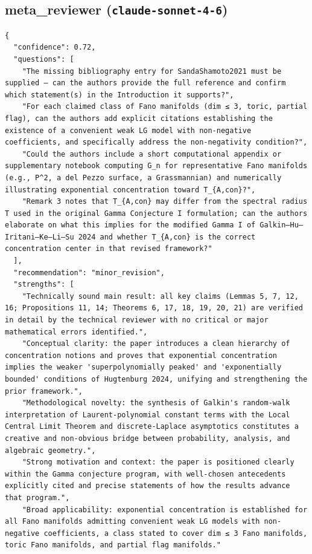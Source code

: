 \documentclass[11pt]{article}
\begin{document}
\subsection*{meta_reviewer (\texttt{claude-sonnet-4-6})}
\begin{verbatim}
{
  "confidence": 0.72,
  "questions": [
    "The missing bibliography entry for SandaShamoto2021 must be supplied — can the authors provide the full reference and confirm which statement(s) in the Introduction it supports?",
    "For each claimed class of Fano manifolds (dim ≤ 3, toric, partial flag), can the authors add explicit citations establishing the existence of a convenient weak LG model with non-negative coefficients, and specifically address the non-negativity condition?",
    "Could the authors include a short computational appendix or supplementary notebook computing G_n for representative Fano manifolds (e.g., P^2, a del Pezzo surface, a Grassmannian) and numerically illustrating exponential concentration toward T_{A,con}?",
    "Remark 3 notes that T_{A,con} may differ from the spectral radius T used in the original Gamma Conjecture I formulation; can the authors elaborate on what this implies for the modified Gamma I of Galkin–Hu–Iritani–Ke–Li–Su 2024 and whether T_{A,con} is the correct concentration center in that revised framework?"
  ],
  "recommendation": "minor_revision",
  "strengths": [
    "Technically sound main result: all key claims (Lemmas 5, 7, 12, 16; Propositions 11, 14; Theorems 6, 17, 18, 19, 20, 21) are verified in detail by the technical reviewer with no critical or major mathematical errors identified.",
    "Conceptual clarity: the paper introduces a clean hierarchy of concentration notions and proves that exponential concentration implies the weaker 'superpolynomially peaked' and 'exponentially bounded' conditions of Hugtenburg 2024, unifying and strengthening the prior framework.",
    "Methodological novelty: the synthesis of Galkin's random-walk interpretation of Laurent-polynomial constant terms with the Local Central Limit Theorem and discrete-Laplace asymptotics constitutes a creative and non-obvious bridge between probability, analysis, and algebraic geometry.",
    "Strong motivation and context: the paper is positioned clearly within the Gamma conjecture program, with well-chosen antecedents explicitly cited and precise statements of how the results advance that program.",
    "Broad applicability: exponential concentration is established for all Fano manifolds admitting convenient weak LG models with non-negative coefficients, a class stated to cover dim ≤ 3 Fano manifolds, toric Fano manifolds, and partial flag manifolds."

\end{verbatim}
\end{document}
